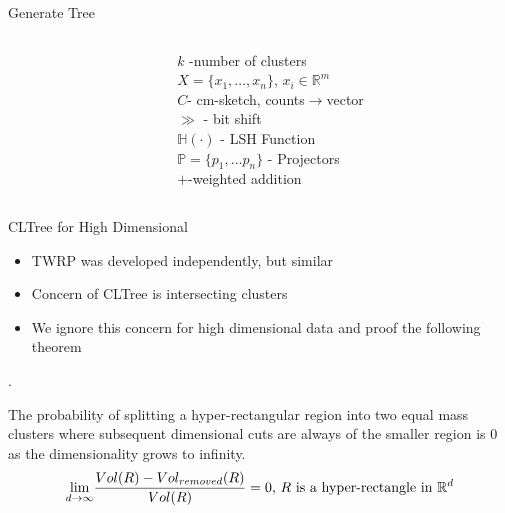 \documentclass[12pt]{beamer}
\begin{document}
\begin{frame}[plain]{Generate Tree}
  \begin{columns}
    \begin{column}{0.5\textwidth} 
    \end{column}
     \begin{column}{0.5\textwidth} 
      $k$ -number of clusters\\
      $X=\{x_1,...,x_n\}$, $x_i \in \mathbb{R}^m$ \\
      $C$- cm-sketch, counts$\rightarrow$vector\\
      $\gg$ - bit shift\\
      $\mathbb{H}(\cdot)$ - LSH Function\\
      $\mathbb{P} = \{p_1,...p_n\}$ - Projectors\\
      $+$-weighted addition
    \end{column}
  \end{columns}
\end{frame}

\begin{frame}[plain]{CLTree for High Dimensional}
\begin{itemize}
 \item TWRP was developed independently, but similar
 \item Concern of CLTree is intersecting clusters
 \item We ignore this concern for high dimensional data and proof the following theorem
\end{itemize}
\begin{Theorem}\label{PrOfCut}
.\\
\begin{minipage}{\textwidth}
The probability of splitting a hyper-rectangular region into two equal mass clusters where subsequent dimensional cuts
are always of the smaller region is 0 as the dimensionality grows to infinity.
$$
\underset{d\rightarrow \infty}{\lim} {{Vol(R) - Vol_{removed}(R)}\over{Vol(R)}} = 0 \text{, }R\text{ is a hyper-rectangle in } \mathbb{R}^d
$$
\end{minipage}
\end{Theorem}
\end{frame}
\end{document}
